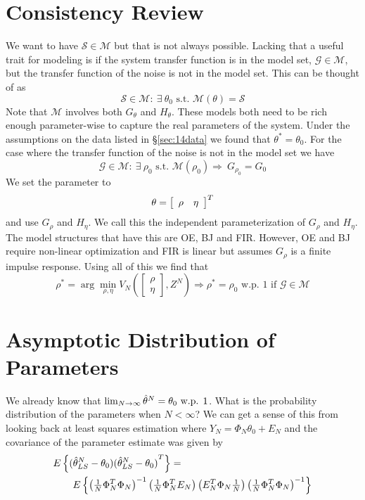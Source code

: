 \section{Consistency Review}
We want to have $\mathcal{S}\in\mathcal{M}$ but that is not always possible.
Lacking that a useful trait for modeling is if the system transfer function is in the model set, $\mathcal{G}\in\mathcal{M}$, but the transfer function of the noise is not in the model set.
This can be thought of as
$$\mathcal{S}\in\mathcal{M}:~\exists~\theta_0 \text{ s.t. } \mathcal{M} (\theta)=\mathcal{S}$$
Note that $\mathcal{M}$ involves both $G_\theta$ and $H_\theta$.
These models both need to be rich enough parameter-wise to capture the real parameters of the system.
Under the assumptions on the data listed in \S\ref{sec:14data} we found that $\theta^\ast=\theta_0$.
For the case where the transfer function of the noise is not in the model set we have
$$\mathcal{G}\in\mathcal{M}:~\exists~\rho_0 \text{ s.t. } \mathcal{M} (\rho_0) \Rightarrow~G_{\rho_0}=G_0$$
We set the parameter to
$$\theta= \left[\begin{array}{c c} \rho & \eta \end{array}\right]^T$$
and use $G_\rho$ and $H_\eta$.
We call this the independent parameterization of $G_\rho$ and $H_\eta$.
The model structures that have this are OE, BJ and FIR\@.
However, OE and BJ require non-linear optimization and FIR is linear but assumes $G_\rho$ is a finite impulse response.
Using all of this we find that
$$\rho^\ast= \arg\min_{\rho,\eta} V_N\left(\left[\begin{array}{c} \rho \\ \eta \end{array}\right],Z^N\right) \Rightarrow\rho^\ast= \rho_0 \text{ w.p. } 1 \text{ if } \mathcal{G}\in\mathcal{M}$$

\section{Asymptotic Distribution of Parameters}
We already know that $\lim_{N\to\infty}\hat{\theta}^N=\theta_0 \text{ w.p. } 1$.
What is the probability distribution of the parameters when $N<\infty$? We can get a sense of this from looking back at least squares estimation where $Y_N=\Phi_N\theta_0+E_N$ and the covariance of the parameter estimate was given by
\begin{align*}
&E\left\lbrace (\hat{\theta}_{LS}^N-\theta_0){(\hat{\theta}_{LS}^N-\theta_0)}^T\right\rbrace = \\
&\qquad E\left\lbrace {\left(\tfrac{1}{N}\Phi_N^T\Phi_N\right)}^{-1} \left(\tfrac{1}{N}\Phi_N^T E_N\right) \left(E_N^T\Phi_N\tfrac{1}{N}\right) {\left(\tfrac{1}{N}\Phi_N^T\Phi_N\right)}^{-1} \right\rbrace
\end{align*}

